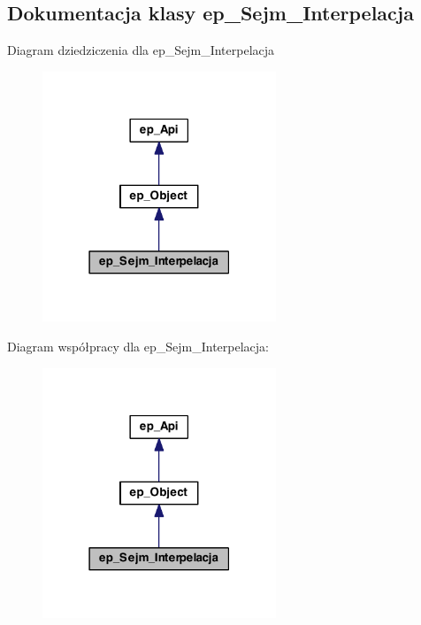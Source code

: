 \hypertarget{classep___sejm___interpelacja}{\subsection{Dokumentacja klasy ep\-\_\-\-Sejm\-\_\-\-Interpelacja}
\label{classep___sejm___interpelacja}
}


Diagram dziedziczenia dla ep\-\_\-\-Sejm\-\_\-\-Interpelacja\nopagebreak
\begin{figure}[H]
\begin{center}
\leavevmode
\includegraphics[width=198pt]{classep___sejm___interpelacja__inherit__graph}
\end{center}
\end{figure}


Diagram współpracy dla ep\-\_\-\-Sejm\-\_\-\-Interpelacja\-:\nopagebreak
\begin{figure}[H]
\begin{center}
\leavevmode
\includegraphics[width=198pt]{classep___sejm___interpelacja__coll__graph}
\end{center}
\end{figure}
